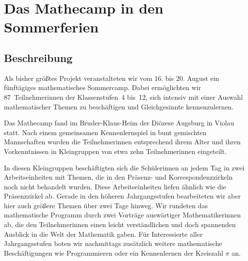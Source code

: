 \documentclass[12pt]{zettel}
\newcommand{\twopics}[2]{%
  \begin{figure}[b]%
    \vspace*{0.5cm}%
    \makebox[\textwidth][c]{%
      \texttt{[image: impressionen/\#1]}%
      \hspace*{1cm}%
      \texttt{[image: impressionen/\#2]}%
    }%
    \vspace*{-1cm}%
  \end{figure}
}
\begin{document}


\section{Das Mathecamp in den Sommerferien}

\subsection{Beschreibung}

\twopics{klein-04}{klein-05}

Als bisher größtes Projekt veranstalteten wir vom 16. bis 20. August ein fünftägiges
mathematisches Sommercamp. Dabei ermöglichten wir 87~Teilnehmerinnen
der Klassenstufen~4 bis~12, sich intensiv mit einer Auswahl
mathematischer Themen zu beschäftigen und Gleichgesinnte kennenzulernen.

Das Mathecamp fand im Bruder-Klaus-Heim der Diözese Augsburg in Violau statt. Nach einem gemeinsamen Kennenlernspiel in bunt gemischten Mannschaften wurden die Teilnehmerinnen
entsprechend ihrem Alter und ihren Vorkenntnissen in Kleingruppen von etwa zehn Teilnehmerinnen eingeteilt.

In diesen Kleingruppen beschäftigten sich die Schülerinnen an jedem Tag
in zwei Arbeitseinheiten mit Themen, die in den Präsenz- und Korrespondenzzirkeln noch nicht behandelt wurden. Diese Arbeitseinheiten liefen ähnlich wie die Präsenzzirkel ab.
Gerade in den höheren Jahrgangsstufen bearbeiteten wir aber hier auch größere Themen über zwei Tage hinweg. Wir rundeten das mathematische
Programm durch zwei Vorträge auswärtiger Mathematikerinnen ab, die den Teilnehmerinnen einen leicht verständlichen und doch
spannenden Ausblick in die Welt der Mathematik gaben. Für Interessierte aller Jahrgangsstufen boten wir nachmittags zusätzlich weitere mathematische Beschäftigungen wie Programmieren
oder ein Kennenlernen der Kreiszahl $\pi$ an.
\end{document}
